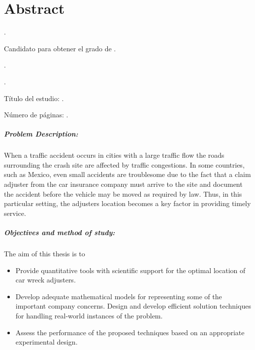 
\chapter{Abstract}

{\setlength{\leftskip}{10mm}
\setlength{\parindent}{-10mm}

\autor.

Candidato para obtener el grado de \grado\orientacion.

\uanl.

\fime.

Título del estudio: \textsc{\titulo}.

\noindent Número de páginas: \pageref*{lastpage}.}

\paragraph{Problem Description:}
When a traffic accident occurs
in cities with a large traffic flow
the roads surrounding the crash site
are affected by traffic congestions.
In some countries, such as Mexico,
even small accidents are troublesome
due to the fact
that a claim adjuster
from the car insurance company
must arrive to the site
and document the accident
before the vehicle may be moved
as required by law.
Thus,
in this particular setting,
the adjusters location
becomes a key factor in providing timely service.

\paragraph{Objectives and method of study:}
The aim of this thesis is to
\begin{itemize}
\item Provide quantitative tools
with scientific support
for the optimal location
of car wreck adjusters.
\item Develop
adequate mathematical models
for representing
some of the important company concerns.
Design and develop efficient solution techniques
for handling real-world instances of the problem.
\item Assess
the performance of the proposed techniques
based on an appropriate experimental design.
\end{itemize}

